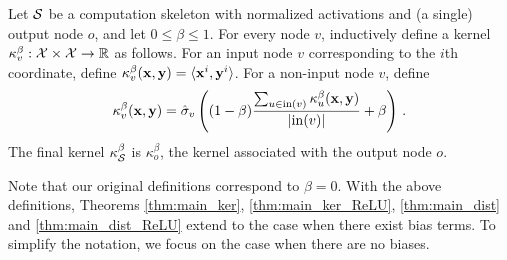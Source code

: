 \begin{definition}
%
Let ${\cal S}$ be a computation skeleton with normalized activations and
(a single) output node $o$, and let $0\le \beta\le 1$.
%
For every node $v$, inductively define a kernel
$\kappa^\beta_v:{\cal X}\times{\cal X}\to{\mathbb R}$ as follows.
%
For an input node $v$ corresponding to the $i$th coordinate,
define $\kappa^\beta_{v}({\mathbf x},{\mathbf y})=\langle {\mathbf x}^i, {\mathbf y}^i \rangle$.
%
For a non-input node $v$, define
$$
\kappa^\beta_v({\mathbf x},{\mathbf y}) =
	\hat\sigma_v\left((1-\beta)
		\frac{\sum_{u\in \mathrm{in}(v)}\kappa^\beta_{u}({\mathbf x},{\mathbf y})}{|\mathrm{in}(v)|} + \beta\right) \,.
    $$
The final kernel $\kappa^\beta_{\cal S}$ is $\kappa^\beta_o$, the kernel associated with
the output node $o$.
\end{definition}
Note that our original definitions correspond to $\beta=0$. With the above definitions, Theorems \ref{thm:main_ker}, \ref{thm:main_ker_ReLU}, \ref{thm:main_dist} and \ref{thm:main_dist_ReLU} extend to the case when there exist bias terms. To simplify the notation, we focus on the case when there are no biases.
